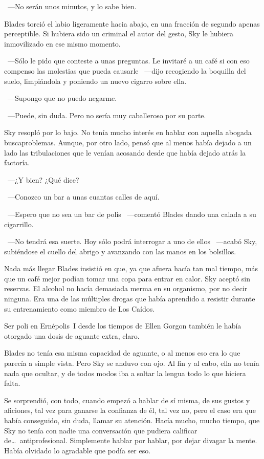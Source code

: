 ~---No serán unos minutos, y lo sabe bien.

Blades torció el labio ligeramente hacia abajo, en una fracción de segundo apenas perceptible. Si hubiera sido un criminal el autor del gesto, Sky le hubiera inmovilizado en ese mismo momento.

~---Sólo le pido que conteste a unas preguntas. Le invitaré a un café si con eso compenso las molestias que pueda causarle ~---dijo recogiendo la boquilla del suelo, limpiándola y poniendo un nuevo cigarro sobre ella.

~---Supongo que no puedo negarme.

~---Puede, sin duda. Pero no sería muy caballeroso por su parte.

Sky resopló por lo bajo. No tenía mucho interés en hablar con aquella abogada buscaproblemas. Aunque, por otro lado, pensó que al menos había dejado a un lado las tribulaciones que le venían acosando desde que había dejado atrás la factoría.

~---¿Y bien? ¿Qué dice?

~---Conozco un bar a unas cuantas calles de aquí.

~---Espero que no sea un bar de polis ~---comentó Blades dando una calada a su cigarrillo.

~---No tendrá esa suerte. Hoy sólo podrá interrogar a uno de ellos ~---acabó Sky, subiéndose el cuello del abrigo y avanzando con las manos en los bolsillos.

\bigskip\noindent
Nada más llegar Blades insistió en que, ya que afuera hacía tan mal tiempo, más que un café mejor podían tomar una copa para entrar en calor. Sky aceptó sin reservas. El alcohol no hacía demasiada merma en su organismo, por no decir ninguna. Era una de las múltiples drogas que había aprendido a resistir durante su entrenamiento como miembro de Los Caídos.

Ser poli en Ernépolis~I desde los tiempos de Ellen Gorgon también le había otorgado una dosis de aguante extra, claro.

Blades no tenía esa misma capacidad de aguante, o al menos eso era lo que parecía a simple vista. Pero Sky se anduvo con ojo. Al fin y al cabo, ella no tenía nada que ocultar, y de todos modos iba a soltar la lengua todo lo que hiciera falta.

Se sorprendió, con todo, cuando empezó a hablar de sí misma, de sus gustos y aficiones, tal vez para ganarse la confianza de él, tal vez no, pero el caso era que había conseguido, sin duda, llamar su atención. Hacía mucho, mucho tiempo, que Sky no tenía con nadie una conversación que pudiera calificar de\dots\ antiprofesional. Simplemente hablar por hablar, por dejar divagar la mente. Había olvidado lo agradable que podía ser eso.

